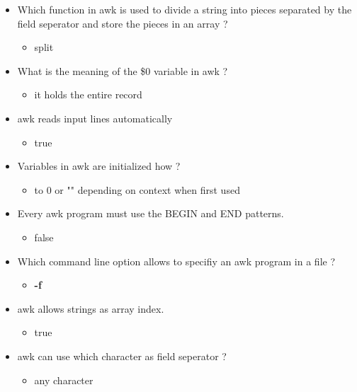\documentclass{report}
\begin{document}
    \begin{itemize}
        \item Which function in awk is used to divide a string into pieces separated by the field seperator and store the pieces in an array ?
            \begin{itemize}
                \item split
            \end{itemize}
        \item What is the meaning of the \$0 variable in awk ?
            \begin{itemize}
                \item it holds the entire record 
            \end{itemize}
        \item awk reads input lines automatically
            \begin{itemize}
                \item true
            \end{itemize}
        \item Variables in awk are initialized how ?
            \begin{itemize}
                \item to 0 or "" depending on context when first used
            \end{itemize}
        \item Every awk program must use the BEGIN and END patterns.
            \begin{itemize}
                \item false
            \end{itemize}
        \item Which command line option allows to specifiy an awk program in a file ?  
            \begin{itemize}
                \item \textbf{-f}
            \end{itemize}
        \item awk allows strings as array index.
            \begin{itemize}
                \item true
            \end{itemize}
        \item awk can use which character as field seperator ?
            \begin{itemize}
                \item any character
            \end{itemize}

\end{itemize}
\end{document}

